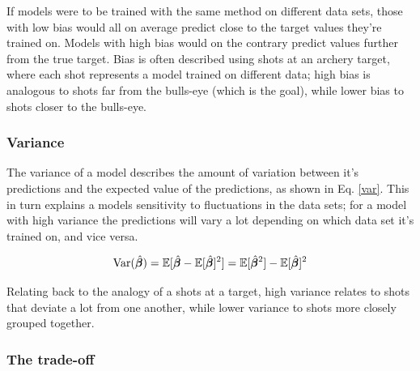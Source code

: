 If models were to be trained with the same method on different data sets, those with low bias would all on average predict close to the target values they're trained on. Models with high bias would on the contrary predict values further from the true target. Bias is often described using shots at an archery target, where each shot represents a model trained on different data; high bias is analogous to shots far from the bulls-eye (which is the goal), while lower bias to shots closer to the bulls-eye.

\subsubsection{Variance}

The variance of a model describes the amount of variation between it's predictions and the expected value of the predictions, as shown in Eq. \ref{var}. This in turn explains a models sensitivity to fluctuations in the data sets; for a model with high variance the predictions will vary a lot depending on which data set it's trained on, and vice versa.

\begin{equation}\label{var}
    \text{Var}(\hat{\boldsymbol{\beta}}) = \mathbb{E}[\hat{\boldsymbol{\beta}}-\mathbb{E}[\hat{\boldsymbol{\beta}}]^2] = \mathbb{E}[\hat{\boldsymbol{\beta}}^2] - \mathbb{E}[\hat{\boldsymbol{\beta}}]^2
\end{equation}

Relating back to the analogy of a shots at a target, high variance relates to shots that deviate a lot from one another, while lower variance to shots more closely grouped together.  

\subsubsection{The trade-off}


